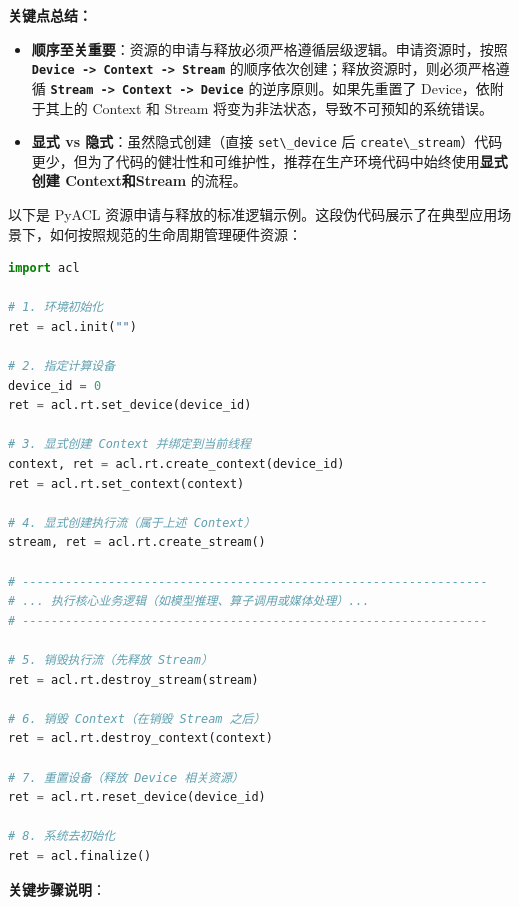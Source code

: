 \textbf{关键点总结：}

\begin{itemize}
\tightlist
\item
  \textbf{顺序至关重要}：资源的申请与释放必须严格遵循层级逻辑。申请资源时，按照
  \textbf{\passthrough{\lstinline!Device -> Context -> Stream!}}
  的顺序依次创建；释放资源时，则必须严格遵循
  \textbf{\passthrough{\lstinline!Stream -> Context -> Device!}}
  的逆序原则。如果先重置了 Device，依附于其上的 Context 和 Stream
  将变为非法状态，导致不可预知的系统错误。
\item
  \textbf{显式 vs 隐式}：虽然隐式创建（直接
  \passthrough{\lstinline!set\_device!} 后
  \passthrough{\lstinline!create\_stream!}）代码更少，但为了代码的健壮性和可维护性，推荐在生产环境代码中始终使用\textbf{显式创建
  Context和Stream} 的流程。
\end{itemize}

以下是 PyACL
资源申请与释放的标准逻辑示例。这段伪代码展示了在典型应用场景下，如何按照规范的生命周期管理硬件资源：

\begin{lstlisting}[language=Python]
import acl

# 1. 环境初始化
ret = acl.init("")

# 2. 指定计算设备
device_id = 0
ret = acl.rt.set_device(device_id)

# 3. 显式创建 Context 并绑定到当前线程
context, ret = acl.rt.create_context(device_id)
ret = acl.rt.set_context(context)

# 4. 显式创建执行流（属于上述 Context）
stream, ret = acl.rt.create_stream()

# -----------------------------------------------------------------
# ... 执行核心业务逻辑（如模型推理、算子调用或媒体处理）...
# -----------------------------------------------------------------

# 5. 销毁执行流（先释放 Stream）
ret = acl.rt.destroy_stream(stream)

# 6. 销毁 Context（在销毁 Stream 之后）
ret = acl.rt.destroy_context(context)

# 7. 重置设备（释放 Device 相关资源）
ret = acl.rt.reset_device(device_id)

# 8. 系统去初始化
ret = acl.finalize()
\end{lstlisting}

\textbf{关键步骤说明}：

